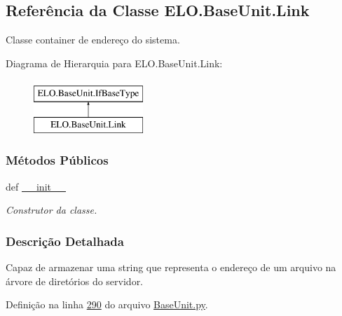 \hypertarget{classELO_1_1BaseUnit_1_1Link}{\subsection{Referência da Classe E\-L\-O.\-Base\-Unit.\-Link}
\label{classELO_1_1BaseUnit_1_1Link}
}


Classe container de endereço do sistema.  


Diagrama de Hierarquia para E\-L\-O.\-Base\-Unit.\-Link\-:\begin{figure}[H]
\begin{center}
\leavevmode
\includegraphics[height=2.000000cm]{d9/dbc/classELO_1_1BaseUnit_1_1Link}
\end{center}
\end{figure}
\subsubsection*{Métodos Públicos}
\begin{DoxyCompactItemize}
\item 
def \hyperlink{classELO_1_1BaseUnit_1_1Link_a0c2308097022f21fc0ded45af15e9172}{\-\_\-\-\_\-init\-\_\-\-\_\-}
\begin{DoxyCompactList}\small\item\em Construtor da classe. \end{DoxyCompactList}\end{DoxyCompactItemize}


\subsubsection{Descrição Detalhada}
Capaz de armazenar uma string que representa o endereço de um arquivo na árvore de diretórios do servidor. 

Definição na linha \hyperlink{BaseUnit_8py_source_l00290}{290} do arquivo \hyperlink{BaseUnit_8py_source}{Base\-Unit.\-py}.



